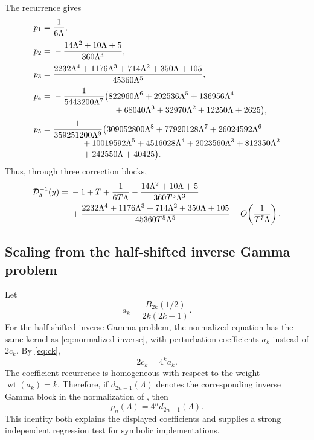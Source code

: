 \documentclass[11pt,oneside]{article}
\theoremstyle{plain}
\theoremstyle{definition}
\theoremstyle{remark}
\newcommand{\DF}{\mathcal D}
\begin{document}
The recurrence gives
\begin{align}
 p_1={}&\frac1{6\Lambda},
 \label{eq:p1}\\[0.2em]
 p_2={}&-\frac{14\Lambda^2+10\Lambda+5}{360\Lambda^3},
 \label{eq:p2}\\[0.2em]
 p_3={}&\frac{
 2232\Lambda^4+1176\Lambda^3+714\Lambda^2+350\Lambda+105}
 {45360\Lambda^5},
 \label{eq:p3}\\[0.2em]
 p_4={}&-\frac1{5443200\Lambda^7}
 \bigl(822960\Lambda^6+292536\Lambda^5+136956\Lambda^4
 \notag\\[-0.3em]
 &\hspace{7.2em}{}+68040\Lambda^3+32970\Lambda^2
 +12250\Lambda+2625\bigr),
 \label{eq:p4}\\[0.2em]
 p_5={}&\frac1{359251200\Lambda^9}
 \bigl(309052800\Lambda^8+77920128\Lambda^7+26024592\Lambda^6
 \notag\\[-0.3em]
 &\hspace{3.4em}{}+10019592\Lambda^5+4516028\Lambda^4
 +2023560\Lambda^3+812350\Lambda^2
 \notag\\[-0.3em]
 &\hspace{3.4em}{}+242550\Lambda+40425\bigr).
 \label{eq:p5}
\end{align}
Thus, through three correction blocks,
\begin{align}
 \DF_\delta^{-1}(y)={}&-1+T
 +\frac1{6T\Lambda}
 -\frac{14\Lambda^2+10\Lambda+5}{360T^3\Lambda^3}
 \notag\\
 &+\frac{2232\Lambda^4+1176\Lambda^3+714\Lambda^2
 +350\Lambda+105}{45360T^5\Lambda^5}
 +O\!\left(\frac1{T^7\Lambda}\right).
 \label{eq:inverse-three-blocks}
\end{align}

\subsection{Scaling from the half-shifted inverse Gamma problem}
\label{sec:gamma-scaling}

Let
\begin{equation}
 a_k=\frac{B_{2k}(1/2)}{2k(2k-1)}.
 \label{eq:ak-gamma}
\end{equation}
For the half-shifted inverse Gamma problem, the normalized equation has the same
kernel as \cref{eq:normalized-inverse}, with perturbation coefficients \(a_k\)
instead of \(2c_k\).  By \cref{eq:ck},
\begin{equation}
 2c_k=4^k a_k.
 \label{eq:scaling-perturbation}
\end{equation}
The coefficient recurrence is homogeneous with respect to the weight
\(\operatorname{wt}(a_k)=k\).  Therefore, if \(d_{2n-1}(\Lambda)\) denotes the
corresponding inverse Gamma block in the normalization of
\cite{ProveItGammaBarnes}, then
\begin{equation}
 \boxed{p_n(\Lambda)=4^n d_{2n-1}(\Lambda).}
 \label{eq:gamma-scaling}
\end{equation}
This identity both explains the displayed coefficients and supplies a strong
independent regression test for symbolic implementations.
\end{document}
